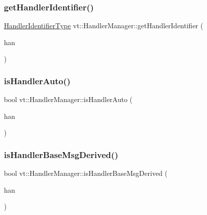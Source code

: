 \mbox{\label{structvt_1_1_handler_manager_a1fc8635a26795f11f16f47eaf74b25a7}} 
\subsubsection{\texorpdfstring{get\+Handler\+Identifier()}{getHandlerIdentifier()}}
{\footnotesize\ttfamily \hyperlink{namespacevt_a59ae068fe828d1c33051ff96f3d016b6}{Handler\+Identifier\+Type} vt\+::\+Handler\+Manager\+::get\+Handler\+Identifier (\begin{DoxyParamCaption}\item[{\hyperlink{namespacevt_af64846b57dfcaf104da3ef6967917573}{Handler\+Type}}]{han }\end{DoxyParamCaption})\hspace{0.3cm}{\ttfamily [static]}}

\mbox{\label{structvt_1_1_handler_manager_a3324aeb71747bdd6b99194674dc03434}} 
\subsubsection{\texorpdfstring{is\+Handler\+Auto()}{isHandlerAuto()}}
{\footnotesize\ttfamily bool vt\+::\+Handler\+Manager\+::is\+Handler\+Auto (\begin{DoxyParamCaption}\item[{\hyperlink{namespacevt_af64846b57dfcaf104da3ef6967917573}{Handler\+Type}}]{han }\end{DoxyParamCaption})\hspace{0.3cm}{\ttfamily [static]}}

\mbox{\label{structvt_1_1_handler_manager_a88c108df63f4d16a17485c08eefe31c5}} 
\subsubsection{\texorpdfstring{is\+Handler\+Base\+Msg\+Derived()}{isHandlerBaseMsgDerived()}}
{\footnotesize\ttfamily bool vt\+::\+Handler\+Manager\+::is\+Handler\+Base\+Msg\+Derived (\begin{DoxyParamCaption}\item[{\hyperlink{namespacevt_af64846b57dfcaf104da3ef6967917573}{Handler\+Type}}]{han }\end{DoxyParamCaption})\hspace{0.3cm}{\ttfamily [static]}}

